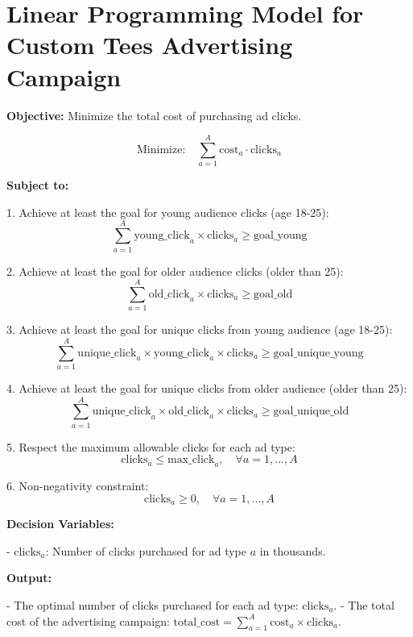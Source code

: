 \documentclass{article}
\begin{document}
\section*{Linear Programming Model for Custom Tees Advertising Campaign}

\textbf{Objective:} Minimize the total cost of purchasing ad clicks.

\[
\text{Minimize:} \quad \sum_{a=1}^{A} \text{cost}_a \cdot \text{clicks}_a
\]

\textbf{Subject to:}

1. Achieve at least the goal for young audience clicks (age 18-25):
   \[
   \sum_{a=1}^{A} \text{young\_click}_{a} \times \text{clicks}_a \geq \text{goal\_young}
   \]

2. Achieve at least the goal for older audience clicks (older than 25):
   \[
   \sum_{a=1}^{A} \text{old\_click}_{a} \times \text{clicks}_a \geq \text{goal\_old}
   \]

3. Achieve at least the goal for unique clicks from young audience (age 18-25):
   \[
   \sum_{a=1}^{A} \text{unique\_click}_{a} \times \text{young\_click}_{a} \times \text{clicks}_a \geq \text{goal\_unique\_young}
   \]

4. Achieve at least the goal for unique clicks from older audience (older than 25):
   \[
   \sum_{a=1}^{A} \text{unique\_click}_{a} \times \text{old\_click}_{a} \times \text{clicks}_a \geq \text{goal\_unique\_old}
   \]

5. Respect the maximum allowable clicks for each ad type:
   \[
   \text{clicks}_a \leq \text{max\_click}_{a}, \quad \forall a = 1, ..., A
   \]

6. Non-negativity constraint:
   \[
   \text{clicks}_a \geq 0, \quad \forall a = 1, ..., A
   \]

\textbf{Decision Variables:}

- \(\text{clicks}_a\): Number of clicks purchased for ad type \(a\) in thousands.

\textbf{Output:}

- The optimal number of clicks purchased for each ad type: \(\text{clicks}_a\).
- The total cost of the advertising campaign: \(\text{total\_cost} = \sum_{a=1}^{A} \text{cost}_a \times \text{clicks}_a\).
\end{document}
